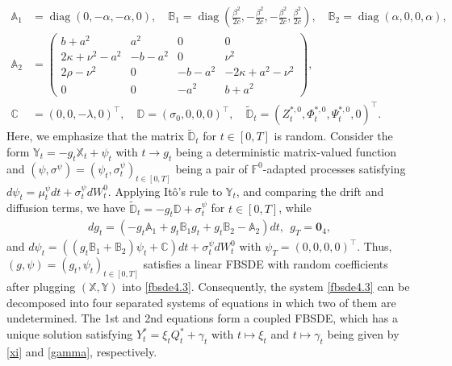 \documentclass[11pt]{article}
\numberwithin{equation}{section}
\DeclareMathOperator{\diag}{diag}
\begin{document}
\begin{align*}
\mathbb{A}_1& = \diag \left(0,-\alpha,-\alpha,0\right), \quad  \mathbb{B}_1 = \diag \left(\frac{\beta^2}{2c},-\frac{\beta^2}{2c},-\frac{\beta^2}{2c},\frac{\beta^2}{2c}\right), \quad \mathbb{B}_2 = \diag \left(\alpha,0,0,\alpha\right),\\
        		\mathbb{A}_2 &=
        		\begin{pmatrix}
        			b+a^2 &a^2  & 0 & 0 \\
        			2\kappa+\nu^2 - a^2& -b-a^2  & 0 & \nu^2 \\
        			2\rho -\nu^2& 0 & -b-a^2 & -2\kappa+a^2 - \nu^2 \\
        			0 & 0 & -a^2& b+a^2
        		\end{pmatrix}, \\%
        		\mathbb{C}& = (0 , 0 , -\lambda , 0)^{\top},\quad
        		\mathbb{D} =(\sigma_0,
        			0,0,0)^{\top}, \quad\widetilde{\mathbb{D}}_t=(Z_t^{*,0},\Phi_t^{*,0},\Psi_t^{*,0},0)^{\top}.
        	\end{align*}
Here, we emphasize that the matrix $\widetilde{\mathbb{D}}_t$ for $t\in[0,T]$ is random.    Consider the form $\mathbb{Y}_t=-g_t\mathbb{X}_t+\psi_t$ with $t\to g_t$ being a deterministic matrix-valued function and $(\psi, \sigma^{\psi})=(\psi_t, \sigma_t^{\psi})_{t\in [0,T]}$ being a pair of $\mathbb{F}^0$-adapted processes satisfying $d\psi_t=\mu_t^{\psi}dt+\sigma_t^{\psi}dW_t^0$.
Applying It\^o's rule to $\mathbb{Y}_t$, and comparing the drift and diffusion terms, we have $\widetilde{\mathbb{D}}_t=-g_t\mathbb{D}+\sigma_t^{\psi}$ for $t\in[0,T]$, while 
\begin{align}\label{rde2}
d{g}_t=\left(-g_t\mathbb{A}_1+g_t\mathbb{B}_1g_t+g_t\mathbb{B}_2-\mathbb{A}_2\right)dt,~~g_T=\boldsymbol{0}_4,
\end{align}
and $d\psi_t=((g_t\mathbb{B}_1+\mathbb{B}_2)\psi_t+\mathbb{C})dt+\sigma_t^{\psi}dW_t^0$ with $\psi_T=(0,0,0,0)^{\top}$. Thus, $(g,\psi)=(g_t,\psi_t)_{t\in[0,T]}$ satisfies a linear FBSDE with random coefficients after plugging $(\mathbb{X}, \mathbb{Y})$ into \eqref{fbsde4.3}. Consequently, the system \eqref{fbsde4.3} can be decomposed into four separated systems of equations in which two of them are undetermined. The 1st and 2nd equations form a coupled FBSDE, which has a unique solution satisfying $Y_t^*=\xi_t Q_t^*+\gamma_t$ with $t\mapsto\xi_t$ and $t\mapsto\gamma_t$ being given by \eqref{xi} and \eqref{gamma}, respectively. 
\end{document}
